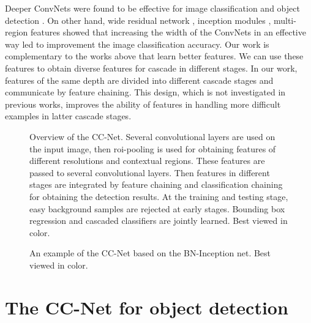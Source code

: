 \documentclass[10pt,twocolumn,letterpaper]{article}
\begin{document}
Deeper ConvNets were found to be effective for image classification and object detection \cite{Krizhevsky:ImageNetCNN,sermanet2013overfeat,simonyan2014very,szegedy2015going,he2016deep}. On other hand, wide residual network \cite{zagoruyko2016wide}, inception modules \cite{szegedy2015going, chollet2016deep}, multi-region features \cite{gidaris2015object, zeng2016gated,bell2015inside}  showed that increasing the width of the ConvNets in an effective way led to improvement the image classification accuracy. Our work is complementary to the works above that learn better features. We can use these features to obtain diverse features for cascade in different stages. In our work, features of the same depth are divided into different cascade stages and  communicate by feature chaining. This design, which is not investigated in previous works, improves the ability of features in handling more difficult examples in latter cascade stages.


\begin{figure*}
\begin{center}
\centerline{}
\end{center}
\vspace{-10pt}
   \caption{Overview of the CC-Net. Several convolutional layers are used on the input image, then roi-pooling is used for obtaining features of different resolutions and contextual regions. These features are passed to several convolutional layers. Then features in different stages are integrated by feature chaining and classification chaining for obtaining the detection results. At the training and testing stage, easy background samples are rejected at early stages. Bounding box regression and cascaded classifiers are jointly learned. Best viewed in color.}
\label{fig:overview}
\end{figure*}

\begin{figure*}
\begin{center}
\centerline{}
\end{center}
\vspace{-10pt}
   \caption{An example of the CC-Net based on the BN-Inception net.  Best viewed in color.}
\label{fig:SC_example}
\end{figure*}

\section{The CC-Net for object detection}
\end{document}
